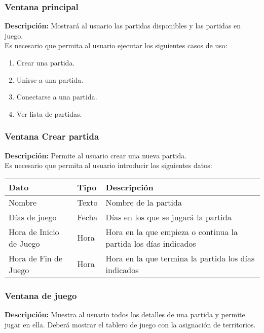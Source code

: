 {\subsubsection{Ventana principal}
{\footnotesize

 \textbf{Descripción:}  Mostrará al usuario las partidas disponibles y las
partidas en
juego.\\
Es necesario que
permita al usuario ejecutar los siguientes casos de uso: \\
\begin{enumerate}
\item Crear una partida.
\item Unirse a una partida.
\item Conectarse a una partida.
\item Ver lista de partidas.

\end{enumerate}
}

\subsubsection{Ventana Crear partida}
{\footnotesize

 \textbf{Descripción:}  Permite al usuario crear una nueva partida.\\
Es necesario que
permita al usuario introducir los siguientes datos: \\

\begin{tabularx}{0.9\textwidth}{llX}
\hline
\textbf{Dato} & \textbf{Tipo} & \textbf{Descripción} \\
\hline
Nombre & Texto & Nombre de la partida \\
Días de juego & Fecha & Días en los que se jugará la partida\\
Hora de Inicio de Juego & Hora & Hora en la que empieza o continua la partida
los días indicados\\
Hora de Fin de Juego & Hora & Hora en la que termina la partida los días
indicados\\
\hline
\end{tabularx}
}

\subsubsection{Ventana de juego}
{\footnotesize



 \textbf{Descripción:}  Muestra al usuario todos los detalles de una partida y
permite
jugar en ella. Deberá mostrar el tablero de juego con la asignación de
territorios.\\

}}
